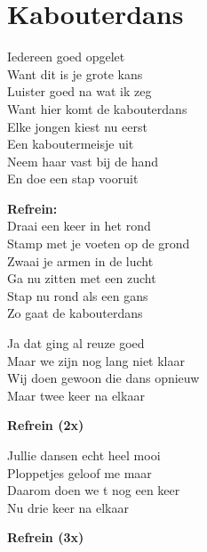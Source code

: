 \section{Kabouterdans}
Iedereen goed opgelet\\
Want dit is je grote kans\\
Luister goed na wat ik zeg\\
Want hier komt de kabouterdans\\
Elke jongen kiest nu eerst\\
Een kaboutermeisje uit\\
Neem haar vast bij de hand\\
En doe een stap vooruit

\textbf{Refrein:}\\
Draai een keer in het rond\\
Stamp met je voeten op de grond\\
Zwaai je armen in de lucht\\
Ga nu zitten met een zucht\\
Stap nu rond als een gans\\
Zo gaat de kabouterdans

Ja dat ging al reuze goed\\
Maar we zijn nog lang niet klaar\\
Wij doen gewoon die dans opnieuw\\
Maar twee keer na elkaar

\textbf{Refrein (2x)}

Jullie dansen echt heel mooi\\
Ploppetjes geloof me maar\\
Daarom doen we t nog een keer\\
Nu drie keer na elkaar

\textbf{Refrein (3x)}
